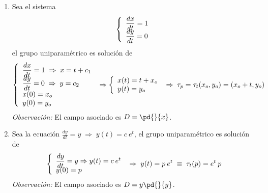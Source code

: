 \begin{ejes}
\begin{enumerate}
 \item Sea el sistema 
 $$\left\{ \begin{array}{l}
              \dfrac{dx}{dt} = 1 \\
              \vspace{-5mm} \\
             \dfrac{dy}{dt} = 0 
\end{array} \right.$$ el grupo uniparamétrico es solución de
             $$\left\{ \begin{array}{l}
              \dfrac{dx}{dt} = 1 \; \Rightarrow \; x=t+c_1  \\
              \vspace{-5mm} \\
             \dfrac{dy}{dt} = 0 \; \Rightarrow \; y=c_2 \\
             x(0) = x_o \\
             y(0) = y_o
\end{array} \right. \; \Rightarrow \left\{ \begin{array}{l}
     x(t)=t+x_o \\
             y(t)=y_o
\end{array}\right. \; \Rightarrow \; \tau_p=\tau_t(x_o,y_o)=(x_o+t,y_o)$$
\textit{Observación:} El campo asociado es $D=\pd{}{x}$.
\item Sea la ecuación $\frac{dy}{dt}=y \; \Rightarrow \; y(t)=c\: e^t$, el grupo uniparamétrico es solución de
             $$\left\{ \begin{array}{l}
              \dfrac{dy}{dt} = y \Rightarrow y(t)=c\: e^t\\
              \vspace{-5mm} \\
             y(0)=p 
\end{array} \right. \; \Rightarrow \; y(t)=p\: e^t \; \equiv \; \tau_t(p)=e^t \: p$$
\textit{Observación:} El campo asociado es $D=y\pd{}{y}$.


\end{enumerate}
\end{ejes}
